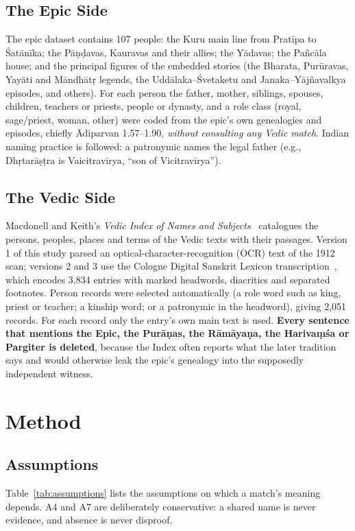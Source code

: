\documentclass[journal]{IEEEtran}
\begin{document}
\subsection{The Epic Side}
The epic dataset contains 107 people: the Kuru main line from Pratīpa to Śatānīka; the Pāṇḍavas, Kauravas and their
allies; the Yādavas; the Pañcāla house; and the principal figures of the embedded stories (the Bharata, Purūravas,
Yayāti and Māndhātṛ legends, the Uddālaka--Śvetaketu and Janaka--Yājñavalkya episodes, and others). For each person
the father, mother, siblings, spouses, children, teachers or priests, people or dynasty, and a role class (royal,
sage/priest, woman, other) were coded from the epic's own genealogies and episodes, chiefly Ādiparvan 1.57--1.90,
\emph{without consulting any Vedic match}. Indian naming practice is followed: a patronymic names the legal father
(e.g., Dhṛtarāṣṭra is Vaicitravīrya, ``son of Vicitravīrya'').

\subsection{The Vedic Side}
Macdonell and Keith's \textit{Vedic Index of Names and Subjects}~\cite{macdonell1912} catalogues the persons, peoples,
places and terms of the Vedic texts with their passages. Version 1 of this study parsed an optical-character-recognition
(OCR) text of the 1912 scan; versions 2 and 3 use the Cologne Digital Sanskrit Lexicon transcription~\cite{cdsl}, which
encodes 3,834 entries with marked headwords, diacritics and separated footnotes. Person records were selected
automatically (a role word such as king, priest or teacher; a kinship word; or a patronymic in the headword),
giving 2,051 records. For each record only the entry's own main text is used. \textbf{Every sentence that mentions the
Epic, the Purāṇas, the Rāmāyaṇa, the Harivaṃśa or Pargiter is deleted}, because the Index often reports what the
later tradition says and would otherwise leak the epic's genealogy into the supposedly independent witness.

\section{Method}

\subsection{Assumptions}
Table~\ref{tab:assumptions} lists the assumptions on which a match's meaning depends. A4 and A7 are deliberately
conservative: a shared name is never evidence, and absence is never disproof.
\end{document}
